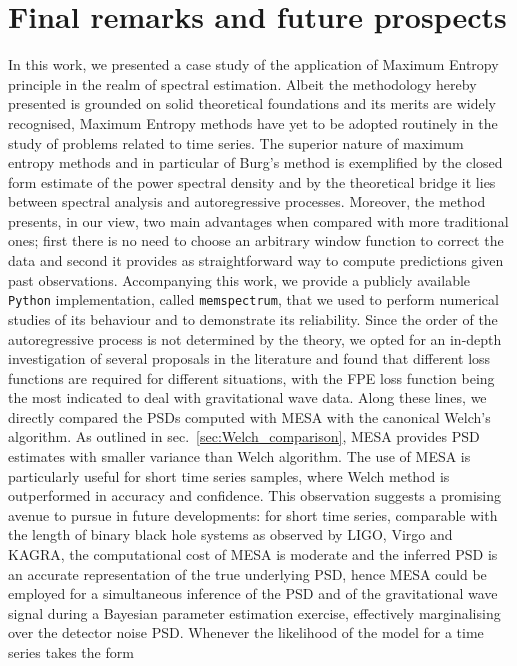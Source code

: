 \documentclass[twocolumn,showpacs,preprintnumbers,nofootinbib,prd,
superscriptaddress,10pt]{revtex4-1}
\begin{document}
\section{Final remarks and future prospects} \label{sec:conclusion}
In this work, we presented a case study of the application of Maximum Entropy principle in the realm of spectral estimation. Albeit the methodology hereby presented is grounded on solid theoretical foundations and its merits are widely recognised, Maximum Entropy methods have yet to be adopted routinely in the study of problems related to time series. The superior nature of maximum entropy methods and in particular of Burg's method is exemplified by the closed form estimate of the power spectral density and by the theoretical bridge it lies between spectral analysis and autoregressive processes. Moreover, the method presents, in our view, two main advantages when compared with more traditional ones; first there is no need to choose an arbitrary window function to correct the data and second it provides as straightforward way to compute predictions given past observations. Accompanying this work, we provide a publicly available \texttt{Python} implementation, called \texttt{memspectrum}, that we used to perform numerical studies of its behaviour and to  demonstrate its reliability. 
Since the order of the autoregressive process is not determined by the theory, we opted for an in-depth investigation of several proposals in the literature and found that different loss functions are required for different situations, with the FPE loss function being the most indicated to deal with gravitational wave data. Along these lines, we directly compared the PSDs computed with MESA with the canonical Welch's algorithm. As outlined in sec.~\ref{sec:Welch_comparison}, MESA provides PSD estimates with smaller variance than Welch algorithm. The use of MESA is particularly useful for short time series samples, where Welch method is outperformed in accuracy and confidence. 
This observation suggests a promising avenue to pursue in future developments: for short time series, comparable with the length of binary black hole systems as observed by LIGO, Virgo and KAGRA, the computational cost of MESA is moderate and the inferred PSD is an accurate representation of the true underlying PSD, hence MESA could be employed for a simultaneous inference of the PSD and of the gravitational wave signal during a Bayesian parameter estimation exercise, effectively marginalising over the detector noise PSD. Whenever the likelihood of the model for a time series takes the form
\end{document}
